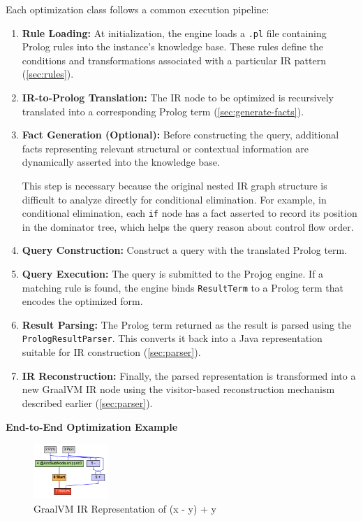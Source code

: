 Each optimization class follows a common execution pipeline:
\begin{enumerate}
    \item \textbf{Rule Loading:} At initialization, the engine loads a \texttt{.pl} file containing Prolog rules into the instance's knowledge base. These rules define the conditions and transformations associated with a particular IR pattern (\autoref{sec:rules}).
    
    \item \textbf{IR-to-Prolog Translation:} The IR node to be optimized is recursively translated into a corresponding Prolog term (\autoref{sec:generate-facts}).

    \item \textbf{Fact Generation (Optional):} Before constructing the query, additional facts representing relevant structural or contextual information are dynamically asserted into the knowledge base.
    
    This step is necessary because the original nested IR graph structure is difficult to analyze directly for conditional elimination. For example, in conditional elimination, each \texttt{if} node has a fact asserted to record its position in the dominator tree, which helps the query reason about control flow order.

    \item \textbf{Query Construction:} Construct a query with the translated Prolog term.
    
    \item \textbf{Query Execution:} The query is submitted to the Projog engine. If a matching rule is found, the engine binds \texttt{ResultTerm} to a Prolog term that encodes the optimized form.
    
    \item \textbf{Result Parsing:} The Prolog term returned as the result is parsed using the \texttt{PrologResultParser}. This converts it back into a Java representation suitable for IR construction (\autoref{sec:parser}).
    
    \item \textbf{IR Reconstruction:} Finally, the parsed representation is transformed into a new GraalVM IR node using the visitor-based reconstruction mechanism described earlier (\autoref{sec:parser}).
\end{enumerate}

\textbf{End-to-End Optimization Example}

\begin{figure}[H]
    \centering
    \includegraphics[width=0.25\textwidth]{./Packages/diagramir.png}
    \caption{GraalVM IR Representation of (x - y) + y}
    \label{fig:diagramir}
\end{figure}

